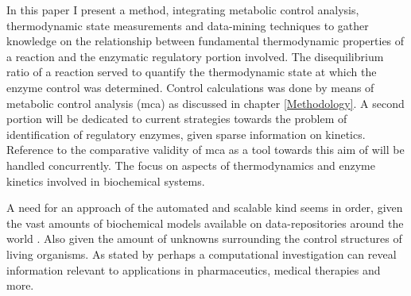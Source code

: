 In this paper I present a method, integrating metabolic control analysis, thermodynamic state measurements and data-mining techniques to gather knowledge on the relationship between fundamental thermodynamic properties of a reaction and the enzymatic regulatory portion involved. The disequilibrium ratio of a reaction served to quantify the thermodynamic state at which the enzyme control was determined. Control calculations was done by means of metabolic control analysis (\gls{mca}) as discussed in chapter \ref{Methodology}. A second portion will be dedicated to current strategies towards the problem of identification of regulatory enzymes, given sparse information on kinetics. Reference to the comparative validity of \gls{mca} as a tool towards this aim of will be handled concurrently. The focus on aspects of thermodynamics and enzyme kinetics involved in biochemical systems.

A need for an approach of the automated and scalable kind seems in order, given the vast amounts of biochemical models available on data-repositories around the world \citep{Kitano2002}. Also given the amount of unknowns surrounding the control structures of living organisms. As stated by \citeauthor{Knudsen2004} perhaps a computational investigation can reveal information relevant to applications in pharmaceutics, medical therapies and more.
